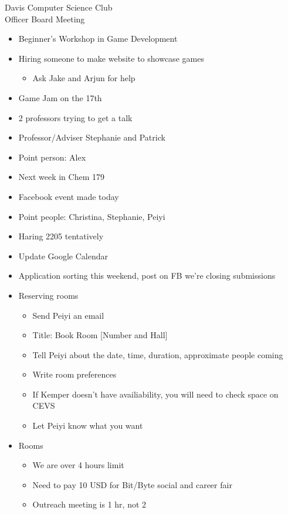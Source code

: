 \documentclass{article}
\begin{document}
\begin{Minutes}{Davis Computer Science Club\\Officer Board Meeting}
\begin {itemize}
\item Beginner's Workshop in Game Development
\item Hiring someone to make website to showcase games
    \begin {itemize}
    \item Ask Jake and Arjun for help
    \end {itemize}
\item Game Jam on the 17th
\item 2 professors trying to get a talk
\item Professor/Adviser Stephanie and Patrick
\end {itemize}

\begin {itemize}
\item Point person: Alex 
\item Next week in Chem 179
\item Facebook event made today
\end {itemize}

\begin {itemize} 
\item Point people: Christina, Stephanie, Peiyi
\item Haring 2205 tentatively
\item Update Google Calendar
\item Application sorting this weekend, post on FB we're closing submissions 
\end {itemize}

\begin {itemize}
\item Reserving rooms
    \begin {itemize}
    \item Send Peiyi an email
    \item Title: Book Room [Number and Hall]
    \item Tell Peiyi about the date, time, duration, approximate people coming
    \item Write room preferences
    \item If Kemper doesn't have availiability, you will need to check space on CEVS
    \item Let Peiyi know what you want
    \end {itemize}
\item Rooms
    \begin {itemize}
    \item We are over 4 hours limit
    \item Need to pay 10 USD for Bit/Byte social and career fair
    \item Outreach meeting is 1 hr, not 2
    \end {itemize}
\end{itemize}


\end{Minutes}
\end{document}
